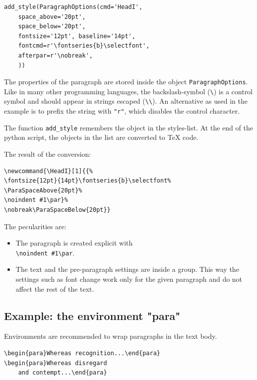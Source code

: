 \documentclass[]{ltugboat}
\begin{document}
\begin{verbatim}
add_style(ParagraphOptions(cmd='HeadI',
    space_above='20pt',
    space_below='20pt',
    fontsize='12pt', baseline='14pt',
    fontcmd=r'\fontseries{b}\selectfont',
    afterpar=r'\nobreak',
    ))
\end{verbatim}

The properties of the paragraph are stored inside the object \verb|ParagraphOptions|. Like in many other programming languages, the backslash-symbol (\verb|\|) is a control symbol and should appear in strings escaped (\verb|\\|). An alternative as used in the example is to prefix the string with \verb|"r"|, which disables the control character.

The function \verb|add_style| remembers the object in the styles-list. At the end of the python script, the objects in the list are converted to \TeX{} code.

The result of the conversion:

\begin{verbatim}
\newcommand{\HeadI}[1]{{%
\fontsize{12pt}{14pt}\fontseries{b}\selectfont%
\ParaSpaceAbove{20pt}%
\noindent #1\par}%
\nobreak\ParaSpaceBelow{20pt}}
\end{verbatim}

The pecularities are:

\begin{itemize}
\item The paragraph is created explicit with\\\verb|\noindent #1\par|.
\item The text and the pre-paragraph settings are inside a group. This way the settings such as font change work only for the given paragraph and do not affect the rest of the text.
\end{itemize}

\subsection{Example: the environment "para"}

Environments are recommended to wrap paragraphs in the text body.

\begin{verbatim}
\begin{para}Whereas recognition...\end{para}
\begin{para}Whereas disregard
    and contempt...\end{para}
\end{verbatim}
\end{document}
